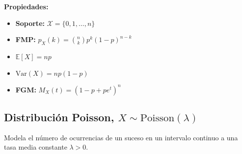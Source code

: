 \vspace{0.8em}
\noindent
\begin{minipage}[c]{0.45\textwidth}
    \textbf{Propiedades:}
    \begin{itemize}\setlength\itemsep{0.3em}
        \item \textbf{Soporte:} $\mathcal{X} = \{0, 1, \dots, n\}$
        \item \textbf{FMP:} $p_X(k) = \binom{n}{k} p^k (1-p)^{n-k}$
        \item $\mathbb{E}[X] = np$
        \item $\text{Var}(X) = np(1-p)$
        \item \textbf{FGM:} $M_X(t) = (1 - p + p e^t)^n$
    \end{itemize}
\end{minipage}%
\hfill
\begin{minipage}[c]{0.5\textwidth}
    \begin{center}
    \end{center}
\end{minipage}

\vspace{1.5em}

\subsection*{Distribución Poisson, $X \sim \text{Poisson}(\lambda)$}
Modela el número de ocurrencias de un suceso en un intervalo continuo a una tasa media constante $\lambda > 0$.

